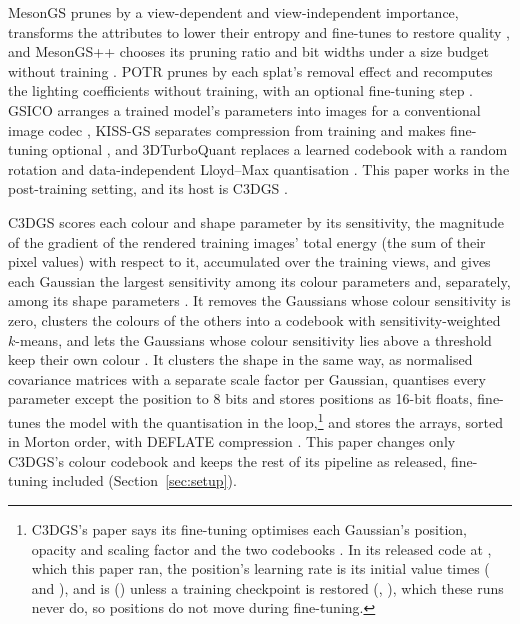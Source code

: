 MesonGS prunes by a view-dependent and view-independent importance, transforms the attributes to lower their entropy and fine-tunes to restore quality \citep{xie2024mesongs}, and MesonGS++ chooses its pruning ratio and bit widths under a size budget without training \citep{xie2026mesongspp}.
POTR prunes by each splat's removal effect and recomputes the lighting coefficients without training, with an optional fine-tuning step \citep{ramlot2026potr}.
GSICO arranges a trained model's parameters into images for a conventional image codec \citep{martin2026structured}, KISS-GS separates compression from training and makes fine-tuning optional \citep{morgenstern2026kiss}, and 3DTurboQuant replaces a learned codebook with a random rotation and data-independent Lloyd--Max quantisation \citep{lee2026turboquant}.
This paper works in the post-training setting, and its host is C3DGS \citep{niedermayr2024compressed}.

C3DGS scores each colour and shape parameter by its sensitivity, the magnitude of the gradient of the rendered training images' total energy (the sum of their pixel values) with respect to it, accumulated over the training views, and gives each Gaussian the largest sensitivity among its colour parameters and, separately, among its shape parameters \citep{niedermayr2024compressed}. %
It removes the Gaussians whose colour sensitivity is zero, clusters the colours of the others into a codebook with sensitivity-weighted $k$-means, and lets the Gaussians whose colour sensitivity lies above a threshold keep their own colour \citep{niedermayr2024compressed}. %
It clusters the shape in the same way, as normalised covariance matrices with a separate scale factor per Gaussian, quantises every parameter except the position to 8 bits and stores positions as 16-bit floats, fine-tunes the model with the quantisation in the loop,\footnote{C3DGS's paper says its fine-tuning optimises each Gaussian's position, opacity and scaling factor and the two codebooks \citep[Sec.~4.2]{niedermayr2024compressed}. In its released code at , which this paper ran, the position's learning rate is its initial value times  ( and ), and  is  () unless a training checkpoint is restored (, ), which these runs never do, so positions do not move during fine-tuning.} and stores the arrays, sorted in Morton order, with DEFLATE compression \citep{niedermayr2024compressed}. %
This paper changes only C3DGS's colour codebook and keeps the rest of its pipeline as released, fine-tuning included (Section~\ref{sec:setup}). %

